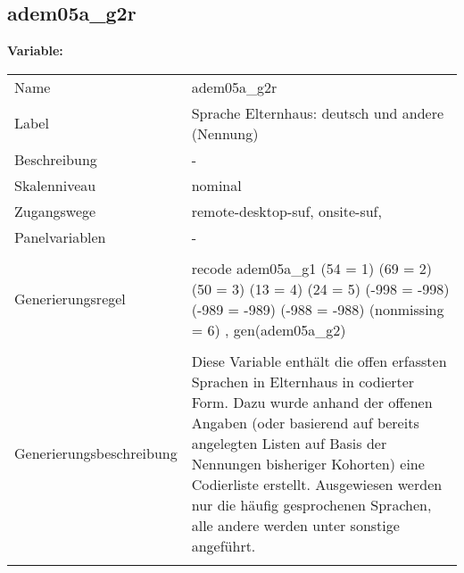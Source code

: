 	
	
	\subsection{adem05a\_g2r}
	\label{subSection:adem05a_g2r}

	\noindent\textbf{Variable:}\\
		\begin{tabular}{lL{11.3cm}}
			\label{tableVariable:adem05a_g2r}
			Name & adem05a\_g2r \\
			Label & Sprache Elternhaus: deutsch und andere (Nennung) \\
			Beschreibung & - \\
			Skalenniveau & nominal \\
			Zugangswege &
				remote-desktop-suf,
				onsite-suf,
 \\
			Panelvariablen & -
			 \\
			 \\
					Generierungsregel & recode adem05a\_g1 (54 = 1) (69 = 2) (50 = 3) (13 = 4)
(24 = 5) (-998 = -998) (-989 = -989) (-988 = -988) 
(nonmissing = 6) , gen(adem05a\_g2) \\
				 \\
					Generierungsbeschreibung & Diese Variable enthält die offen erfassten Sprachen in Elternhaus in codierter Form. Dazu wurde anhand der offenen Angaben (oder basierend auf bereits angelegten Listen auf Basis der Nennungen bisheriger Kohorten) eine Codierliste erstellt. Ausgewiesen werden nur die häufig gesprochenen Sprachen, alle andere werden unter sonstige angeführt.
				 \\	
			 \\
		\end{tabular}






